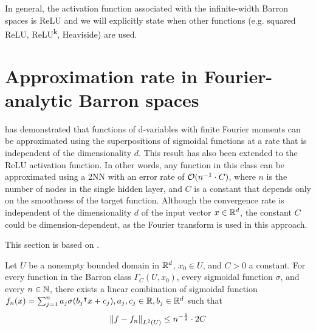 In general, the activation function associated with the infinite-width Barron
spaces is ReLU and we will explicitly state when other functions (e.g. squared
ReLU, ReLU\textsuperscript{k}, Heaviside) are used.




\section{Approximation rate in Fourier-analytic Barron spaces}
\label{sec:approximation_rate_fouier}

\cite{barronUniversalApproximationBounds1993} has demonstrated that functions of
d-variables with finite Fourier moments can be approximated using the
superpositions of sigmoidal functions at a rate that is independent of the
dimensionality $d$. This result has also been extended to the ReLU activation
function. In other words, any function in this class can be approximated using a
2NN with an error rate of $\mathcal{O}(n^{-1} \cdot C)$, where $n$ is the number of
nodes in the single hidden layer, and $C$ is a constant that depends only on the
smoothness of the target function. Although the convergence rate is independent
of the dimensionality $d$ of the input vector $x \in \mathbb{R}^d$, the constant $C$
could be dimension-dependent, as the Fourier transform is used in this approach.

This section is based on \cite{barronUniversalApproximationBounds1993}.


\begin{theorem}
    \label{thm:barron_1993_1}
    Let $U$ be a nonempty bounded domain in $\mathbb{R}^d$, $x_0 \in U$, and $C > 0$ a
    constant. For every function in the Barron class $\Gamma_C(U, x_0)$, every
    sigmoidal function $\sigma$, and every $n \in \mathbb{N}$, there exists a linear
    combination of sigmoidal function $f_n(x) = \sum_{j=1}^n a_j \sigma(b_j{}^{\intercal}
    x+c_j), a_j, c_j \in \mathbb{R}, b_j \in \mathbb{R}^d$ such that
    \begin{equation}
        \left\| f - f_n \right\|_{L^{2}(U)}\leq n^{-\frac{1}{2}} \cdot 2C
    \end{equation}
\end{theorem}

